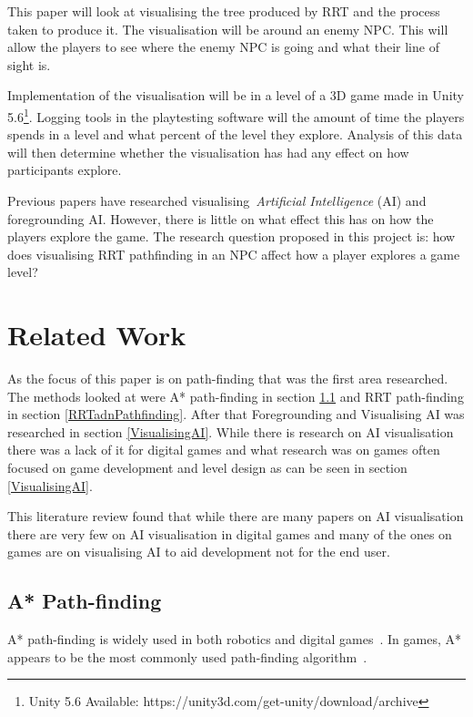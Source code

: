 \documentclass[journal]{IEEEtran}
\begin{document}
This paper will look at visualising the tree produced by RRT and the process taken to produce it. The visualisation will be around an enemy NPC. This will allow the players to see where the enemy NPC is going and what their line of sight is. 

Implementation of the visualisation will be in a level of a 3D game made in Unity 5.6\footnote[1]{Unity 5.6 Available: https://unity3d.com/get-unity/download/archive}. Logging tools in the playtesting software will the amount of time the players spends in a level and what percent of the level they explore. Analysis of this data will then determine whether the visualisation has had any effect on how participants explore.

Previous papers have researched visualising~\textit{Artificial Intelligence} (AI) and foregrounding AI. However, there is little on what effect this has on how the players explore the game.
The research question proposed in this project is: how does visualising RRT pathfinding in an NPC affect how a player explores a game level?

\section{Related Work} \label{RelatedWork}
As the focus of this paper is on path-finding that was the first area researched. The methods looked at were A* path-finding in section \ref{A*PF} and RRT path-finding in section \ref{RRTadnPathfinding}.  After that Foregrounding and Visualising AI was researched in section \ref{VisualisingAI}. While there is research on AI visualisation there was a lack of it for digital games and what research was on games often focused on game development and level design as can be seen in section \ref{VisualisingAI}. 

This literature review found that while there are many papers on AI visualisation there are very few on AI visualisation in digital games and many of the ones on games are on visualising AI to aid development not for the end user. 




\subsection{A* Path-finding} \label{A*PF}
A* path-finding is widely used in both robotics and digital games~\cite{Algfoor2015}. In games, A* appears to be the most commonly used path-finding algorithm~\cite{Algfoor2015}.
\end{document}

